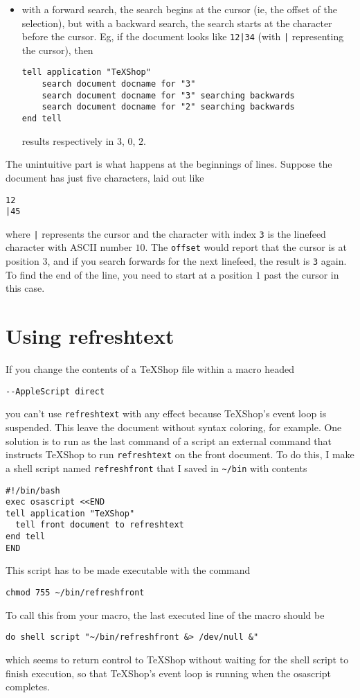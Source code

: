 \documentclass[11pt]{amsart}
\begin{document}
\begin{itemize}
\item
with a forward search, the search begins at the cursor (ie, the offset of the selection), but with a backward search, the search starts at the character before the cursor. Eg, if the document looks like \verb+12|34+ (with \verb+|+ representing the cursor), then
\begin{verbatim}
tell application "TeXShop"
    search document docname for "3"
    search document docname for "3" searching backwards
    search document docname for "2" searching backwards    
end tell
\end{verbatim}
results respectively in  $3$, $0$, $2$.
\end{itemize}
The unintuitive part is what happens at the beginnings of lines. Suppose the document has just five characters, laid out like
\begin{verbatim}
12
|45
\end{verbatim}
where \verb+|+ represents the cursor and the character with index {\tt 3} is the linefeed character with ASCII number $10$. The {\tt offset} would report that the cursor is at position $3$, and if you search forwards for the next linefeed, the result is {\tt 3} again. To find the end of the line, you need to start at a position $1$ past the cursor in this case.


\section{Using refreshtext}
If you change the contents of a TeXShop file within a macro headed\begin{verbatim}
--AppleScript direct
\end{verbatim}
you can't use {\tt refreshtext} with any effect because TeXShop's event loop is suspended. This leave the document without syntax coloring, for example. One solution is to run as the last command of a script an external command that instructs TeXShop to run {\tt refreshtext} on the front document. To do this, I make a shell script named {\tt refreshfront} that I saved in \verb|~/bin|  with contents
\begin{verbatim}
#!/bin/bash
exec osascript <<END
tell application "TeXShop"
  tell front document to refreshtext
end tell
END
\end{verbatim}
This script has to be made executable with the command
\begin{verbatim}
chmod 755 ~/bin/refreshfront 
\end{verbatim}
To call this from your macro, the last executed line of the macro should be
\begin{verbatim}
do shell script "~/bin/refreshfront &> /dev/null &"
\end{verbatim}
which seems to return control to TeXShop without waiting for the shell script to finish execution, so that TeXShop's event loop is running when the osascript completes.
\end{document}
